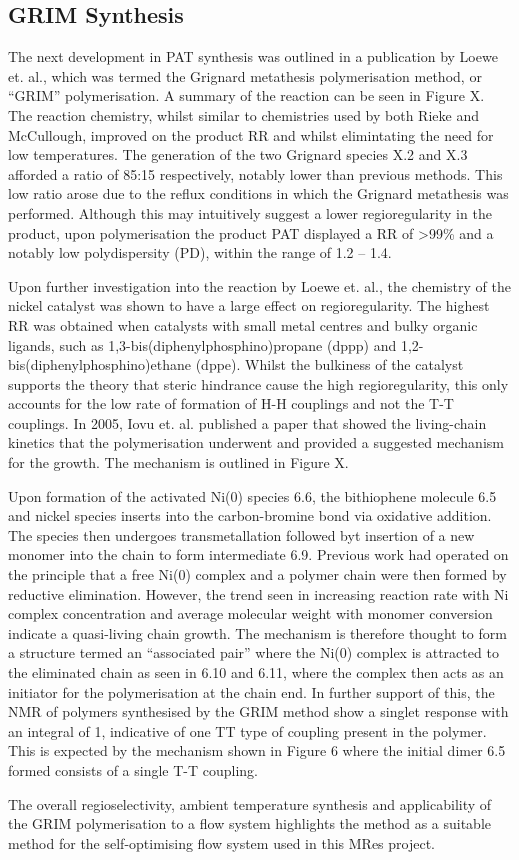\subsection{GRIM Synthesis}

The next development in PAT synthesis was outlined in a publication by Loewe et. al., which was termed the Grignard metathesis polymerisation method, or “GRIM” polymerisation. A summary of the reaction can be seen in Figure X. The reaction chemistry, whilst similar to chemistries used by both Rieke and McCullough, improved on the product RR and whilst elimintating the need for low temperatures. The generation of the two Grignard species X.2 and X.3 afforded a ratio of 85:15 respectively, notably lower than previous methods. This low ratio arose due to the reflux conditions in which the Grignard metathesis was performed. Although this may intuitively suggest a lower regioregularity in the product, upon polymerisation the product PAT displayed a RR of >99\% and a notably low polydispersity (PD), within the range of 1.2 – 1.4.

Upon further investigation into the reaction by Loewe et. al., the chemistry of the nickel catalyst was shown to have a large effect on regioregularity. The highest RR was obtained when catalysts with small metal centres and bulky organic ligands, such as 1,3-bis(diphenylphosphino)propane (dppp) and 1,2-bis(diphenylphosphino)ethane (dppe). Whilst the bulkiness of the catalyst supports the theory that steric hindrance cause the high regioregularity, this only accounts for the low rate of formation of H-H couplings and not the T-T couplings. In 2005, Iovu et. al. published a paper that showed the living-chain kinetics that the polymerisation underwent and provided a suggested mechanism for the growth. The mechanism is outlined in Figure X.

Upon formation of the activated Ni(0) species 6.6, the bithiophene molecule 6.5 and nickel species inserts into the carbon-bromine bond via oxidative addition. The species then undergoes transmetallation followed byt insertion of a new monomer into the chain to form intermediate 6.9. Previous work had operated on the principle that a free Ni(0) complex and a polymer chain were then formed by reductive elimination. However, the trend seen in increasing reaction rate with Ni complex concentration and average molecular weight with monomer conversion indicate a quasi-living chain growth. The mechanism is therefore thought to form a structure termed an “associated pair” where the Ni(0) complex is attracted to the eliminated chain as seen in 6.10 and 6.11, where the complex then acts as an initiator for the polymerisation at the chain end. In further support of this, the NMR of polymers synthesised by the GRIM method show a singlet response with an integral of 1, indicative of one TT type of coupling present in the polymer. This is expected by the mechanism shown in Figure 6 where the initial dimer 6.5 formed consists of a single T-T coupling. 

The overall regioselectivity, ambient temperature synthesis and applicability of the GRIM polymerisation to a flow system highlights the method as a suitable method for the self-optimising flow system used in this MRes project. 
